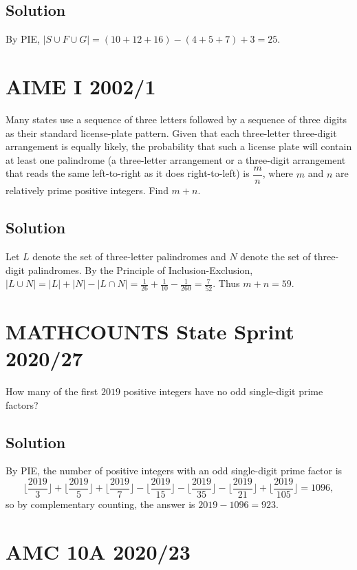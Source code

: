 \documentclass[mast]{lucky}
\begin{document}
\subsection{Solution}
By PIE, $|S\cup F\cup G|=(10+12+16)-(4+5+7)+3=25.$


\pagebreak\section{AIME I 2002/1}
Many states use a sequence of three letters followed by a sequence of three digits as their standard license-plate pattern. Given that each three-letter three-digit arrangement is equally likely, the probability that such a license plate will contain at least one palindrome (a three-letter arrangement or a three-digit arrangement that reads the same left-to-right as it does right-to-left) is $\dfrac{m}{n}$, where $m$ and $n$ are relatively prime positive integers. Find $m+n.$

\subsection{Solution}
Let $L$ denote the set of three-letter palindromes and $N$ denote the set of three-digit palindromes. By the Principle of Inclusion-Exclusion, $|L\cup N|=|L|+|N|-|L\cap N|=\frac{1}{26}+\frac{1}{10}-\frac{1}{260}=\frac{7}{52}.$ Thus $m+n=59.$



\pagebreak\section{MATHCOUNTS State Sprint 2020/27}

How many of the first $2019$ positive integers have no odd single-digit prime factors?

\subsection{Solution}

By PIE, the number of positive integers with an odd single-digit prime factor is
\[\lfloor\frac{2019}{3}\rfloor+\lfloor\frac{2019}{5}\rfloor+\lfloor\frac{2019}{7}\rfloor-\lfloor\frac{2019}{15}\rfloor-\lfloor\frac{2019}{35}\rfloor-\lfloor\frac{2019}{21}\rfloor+\lfloor\frac{2019}{105}\rfloor=1096,\]
so by complementary counting, the answer is $2019-1096=923.$


\pagebreak\section{AMC 10A 2020/23}
\end{document}
